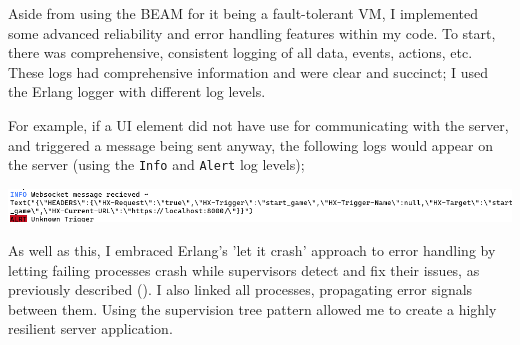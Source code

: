 \documentclass[]{final}
\begin{document}
Aside from using the BEAM for it being a fault-tolerant VM, I implemented some
advanced reliability and error handling features within my code. To start, there
was comprehensive, consistent logging of all data, events, actions, etc. These
logs had comprehensive information and were clear and succinct; I used the
Erlang logger with different log levels.%

For example, if a UI element did not have use for communicating with the server,
and triggered a message being sent anyway, the following logs would appear on the
server (using the \lstinline|Info| and \lstinline|Alert| log levels);

\includegraphics[width=\linewidth]{unknown_trigger_alert.png}

As well as this, I embraced Erlang's 'let it crash' approach to error
handling by letting failing processes crash while supervisors detect and
fix their issues, as previously described {\hypersetup{linkcolor=teal}(\pageref{faultErlang})}.
I also linked all processes, propagating error signals between them.
Using the supervision tree pattern allowed me to create a highly resilient \cite{noauthor_gleam-otp-design-principals/gleam-otp-design-principals.org_nodate}
server application.
\end{document}
